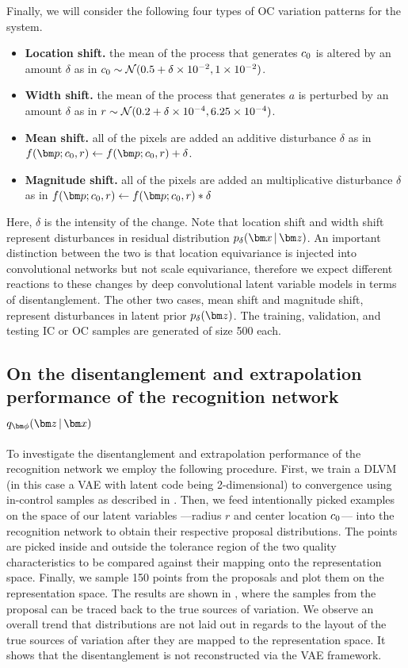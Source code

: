 \documentclass{scrartcl}
\theoremstyle{definition}
\let\ref\Cref
\begin{document}
Finally, we will consider the following four types of OC variation patterns for the system. 
\begin{itemize}
	\item \textbf{Location shift.} the mean of the process that generates $ c_{0} $ is altered by an amount $ \delta $ as in $c_{0} \sim \mathcal{N}(0.5 + \delta\times10^{-2}, 1\times10^{-2})$.
	\item \textbf{Width shift.} the mean of the process that generates $ a $ is perturbed by an amount $ \delta $ as in $r \sim \mathcal{N}(0.2+\delta\times10^{-4}, 6.25\times10^{-4})$. 
	\item \textbf{Mean shift.} all of the pixels are added an additive disturbance $ \delta $ as in $f(\mbp; c_0,r) \leftarrow f(\mbp; c_0,r) + \delta$.
	\item \textbf{Magnitude shift.} all of the pixels are added an multiplicative disturbance $ \delta $ as in $f(\mbp; c_0,r) \leftarrow f(\mbp; c_0,r) * \delta$
\end{itemize}
Here, $ \delta $ is the intensity of the change.
Note that location shift and width shift represent disturbances in residual distribution $p_{\delta}(\mbx \g \mbz)$.
An important distinction between the two is that location equivariance is injected into convolutional networks but not scale equivariance, therefore we expect different reactions to these changes by deep convolutional latent variable models in terms of disentanglement.
The other two cases, mean shift and magnitude shift, represent disturbances in latent prior $p_{\delta}(\mbz)$.
The training, validation, and testing IC or OC samples are generated of size 500 each. 

\subsection{On the disentanglement and extrapolation performance of the recognition network $\encoding$}
\label{sec:simstudy:recognition}
To investigate the disentanglement and extrapolation performance of the recognition network we employ the following procedure. 
First, we train a DLVM (in this case a VAE with latent code being 2-dimensional) to convergence using in-control samples as described in \ref{sec:simsetting}. 
Then, we feed intentionally picked examples on the space of our latent variables ---radius $r$ and center location $c_{0}$--- into the recognition network to obtain their respective proposal distributions.
The points are picked inside and outside the tolerance region of the two quality characteristics to be compared against their mapping onto the representation space.
Finally, we sample 150 points from the proposals and plot them on the representation space.
The results are shown in \ref{fig:proposals}, where the samples from the proposal can be traced back to the true sources of variation. We observe an overall trend that distributions are not laid out in regards to the layout of the true sources of variation after they are mapped to the representation space. It shows that the disentanglement is not reconstructed via the VAE framework. 
\end{document}
